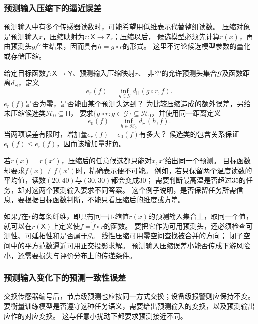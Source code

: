 \subsubsection{预测输入压缩下的逼近误差}
\label{sec:future-analysis-input-compression}

预测输入中有多个传感器读数时，可能希望用低维表示代替整组读数。
压缩对象是预测输入$x$，压缩映射为$r:\mathsf X\to\mathsf Z_r$；压缩以后，
候选模型必须先计算$r(x)$，再由预测头$g$产生结果，因而具有$h=g\circ r$的形式。
这里不讨论候选模型参数的量化或存储压缩。

\begin{mathproblem}[预测输入压缩造成的最佳逼近误差]
  \label{question:future-input-compression}
  给定目标函数$f:\mathsf X\to\mathsf Y$、预测输入压缩映射$r$、
  非空的允许预测头集合$\mathcal G$及函数距离$d_{\mathsf H}$，定义
  \[
    e_r(f)=\inf_{g\in\mathcal G}d_{\mathsf H}(g\circ r,f).
  \]
  $e_r(f)$是否为零，是否能由某个预测头达到？
  为比较压缩造成的额外误差，另给未压缩候选类$\mathcal H_0\subseteq\mathsf H$，
  要求$\{g\circ r:g\in\mathcal G\}\subseteq\mathcal H_0$，并使用同一距离定义
  \[
    e_0(f)=\inf_{h\in\mathcal H_0}d_{\mathsf H}(h,f).
  \]
  当两项误差有限时，增加量$e_r(f)-e_0(f)$有多大？
  候选类的包含关系保证$e_0(f)\leq e_r(f)$，因而该增加量非负。
\end{mathproblem}

若$r(x)=r(x')$，压缩后的任意候选都只能对$x,x'$给出同一个预测。
目标函数却要求$f(x)\ne f(x')$时，精确表示便不可能。
例如，若只保留两个温度读数的平均值，读数$(20,40)$与$(30,30)$都会变成$30$；
需要判断最高温是否超过$35$的任务，却对这两个预测输入要求不同答案。
这个例子说明，是否保留任务所需信息，要根据目标函数判断，不能只看压缩后的维度或方差。

如果$f$在$r$的每条纤维，即具有同一压缩值$r(x)$的预测输入集合上，取同一个值，就可以在$r(\mathsf X)$上定义使$f=\widetilde f\circ r$的函数。
要把它作为可用预测头，还必须检查可测性、可延拓性和是否属于$\mathcal G$。
线性压缩可用零空间查找被合并的方向；
闭子空间中的平方范数逼近可用正交投影求解。
预测输入压缩误差小能否传成下游风险小，还需要损失与评价分布上的传递条件。

\subsubsection{预测输入变化下的预测一致性误差}
\label{sec:future-analysis-structural-property}

交换传感器编号后，节点级预测也应按同一方式交换；设备级报警则应保持不变。
要衡量训练模型是否遵守这种任务语义，需要给出预测输入的变换，以及预测输出应作的对应变换。
这与任意小扰动下都要求预测接近不同。

